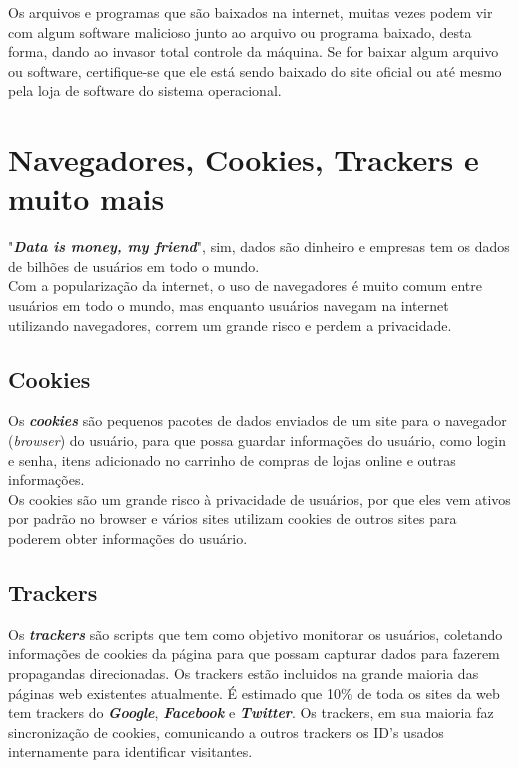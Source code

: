 \documentclass[12pt, letterpaper, Monospace:12]{report}
\begin{document}
	Os arquivos e programas que são baixados na internet, muitas vezes podem vir com algum software malicioso junto ao arquivo ou programa baixado, desta forma, dando ao invasor total controle da máquina. Se for baixar algum arquivo ou software, certifique-se que ele está sendo baixado do site oficial ou até mesmo pela loja de software do sistema operacional.\\

\pagebreak

\section{Navegadores, Cookies, Trackers e muito mais}
	"\textbf{\textit{Data is money, my friend}}", sim, dados são dinheiro e empresas tem os dados de bilhões de usuários em todo o mundo.\\

	Com a popularização da internet, o uso de navegadores é muito comum entre usuários em todo o mundo, mas enquanto usuários navegam na internet utilizando navegadores, correm um grande risco e perdem a privacidade.\\

\subsection{Cookies}
	Os \textbf{\textit{cookies}} são pequenos pacotes de dados enviados de um site para o navegador (\textit{browser}) do usuário, para que possa guardar informações do usuário, como login e senha, itens adicionado no carrinho de compras de lojas online e outras informações.\\

	Os cookies são um grande risco à privacidade de usuários, por que eles vem ativos por padrão no browser e vários sites utilizam cookies de outros sites para poderem obter informações do usuário.\\

\subsection{Trackers}
	Os \textbf{\textit{trackers}} são scripts que tem como objetivo monitorar os usuários, coletando informações de cookies da página para que possam capturar dados para fazerem propagandas direcionadas. Os trackers estão incluidos na grande maioria das páginas web existentes atualmente. É estimado que 10\% de toda os sites da web tem trackers do \textbf{\textit{Google}}, \textbf{\textit{Facebook}} e \textbf{\textit{Twitter}}. Os trackers, em sua maioria faz sincronização de cookies, comunicando a outros trackers os ID's usados internamente para identificar visitantes.\\
\end{document}
